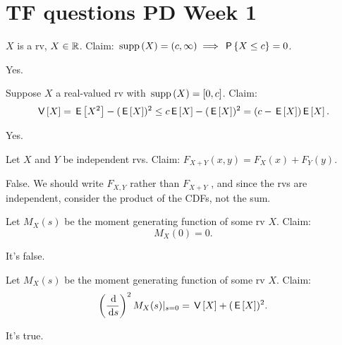 \documentclass[tf-tutorial-all.tex]{subfiles}
\begin{document}
\setcounter{section}{0}
\section{TF questions PD Week 1}


\begin{truefalse}
$X$ is a rv, $X  \in \mathbb{R}$. Claim: $\,\mathrm{supp}\left(X\right) = (c, \infty) \implies \,\mathsf{P}\left\{X\leq c\right\} = 0$.
\begin{solution}
Yes.
\end{solution}
\end{truefalse}

\begin{truefalse}
Suppose $X$ a real-valued rv with $\,\mathrm{supp}\left(X\right) = [0, c]$. Claim:
\begin{equation}
\label{eq:3}
\,\mathsf{V}\left[X\right] = \,\mathsf{E}\left[X^2\right] - (\,\mathsf{E}\left[X\right])^2 \leq c \,\mathsf{E}\left[X\right] - (\,\mathsf{E}\left[X\right])^2 = (c-\,\mathsf{E}\left[X\right])\,\mathsf{E}\left[X\right].
\end{equation}
\begin{solution}
Yes.
\end{solution}
\end{truefalse}


\begin{truefalse}
Let $X$ and $Y$ be independent rvs. Claim: $F_{X+Y}(x, y) = F_X(x) + F_{Y}(y)$.
\begin{solution}
False. We should write $F_{X,Y}$ rather than $F_{X+Y}$ , and since the rvs are independent, consider the product of the CDFs, not the sum.
\end{solution}
\end{truefalse}

\begin{truefalse}
Let $M_{X}(s)$ be the moment generating function of some rv $X$.  Claim:
\begin{equation}
\label{eq:2}
M_{X}(0) = 0.
\end{equation}
\begin{solution}
It's false.
\end{solution}
\end{truefalse}


\begin{truefalse}
Let $M_{X}(s)$ be the moment generating function of some rv $X$.  Claim:
\begin{equation}
\label{eq:2}
\left(\frac{\d}{\d s}\right)^{2 }M_{X}(s)|_{s=0} =  \V X + (\E{X})^{2}.
\end{equation}
\begin{solution}
It's true.
\end{solution}
\end{truefalse}
\end{document}
